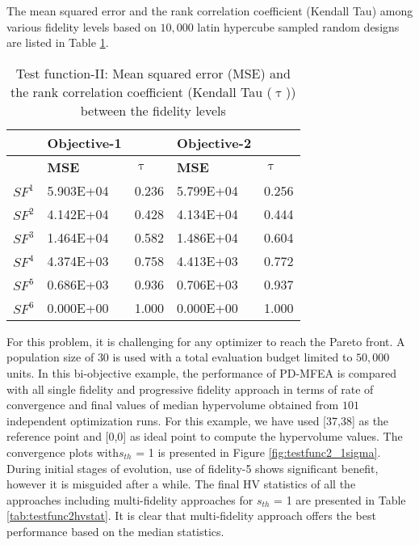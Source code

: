 The mean squared error and the rank correlation coefficient (Kendall Tau) among various fidelity levels based on $10,000$ latin hypercube sampled random designs are listed in Table \ref{tab:mse_tau_testfunc2}.

\begin{table}[!htb]\footnotesize
	\centering
	\caption{Test function-II: Mean squared error (MSE) and the rank correlation coefficient (Kendall Tau ($\uptau$)) between the fidelity levels}
	\label{tab:mse_tau_testfunc2}
	\begin{tabular}{|l|l|l|l|l|}
		\noalign{\smallskip}\hline
		& \textbf{Objective-1} &                      & \textbf{Objective-2} &                      \\ \hline
		& \textbf{MSE}         & \textbf{$\uptau$} & \textbf{MSE}         & \textbf{$\uptau$} \\ \hline
		\textbf{$SF^1$} & 5.903E+04           & 0.236               & 5.799E+04           & 0.256               \\ \hline
		\textbf{$SF^2$} & 4.142E+04           & 0.428               & 4.134E+04           & 0.444               \\ \hline
		\textbf{$SF^3$} & 1.464E+04           & 0.582               & 1.486E+04           & 0.604               \\ \hline
		\textbf{$SF^4$} & 4.374E+03           & 0.758               & 4.413E+03           & 0.772               \\ \hline
		\textbf{$SF^5$} & 0.686E+03           & 0.936               & 0.706E+03           & 0.937               \\ \hline
		\textbf{$SF^6$} & 0.000E+00           & 1.000               & 0.000E+00           & 1.000               \\ \hline
	\end{tabular}
\end{table}

For this problem, it is challenging for any optimizer to reach the Pareto front. A population size of $30$ is used with a total evaluation budget limited to $50,000$ units. In this bi-objective example, the performance of PD-MFEA is compared with all single fidelity and progressive fidelity approach in terms of rate of convergence and final values of median hypervolume obtained from $101$ independent optimization runs. For this example, we have used [37,38] as the reference point and [0,0] as ideal point to compute the hypervolume values. The convergence plots with$s_{th}$ = 1 is presented in Figure \ref{fig:testfunc2_1sigma}. During initial stages of evolution, use of fidelity-5 shows significant benefit, however it is misguided after a while. The final HV statistics of all the approaches including multi-fidelity approaches for $s_{th}$ = 1 are presented in Table \ref{tab:testfunc2hvstat}. It is clear that multi-fidelity approach offers the best performance based on the median statistics. 

